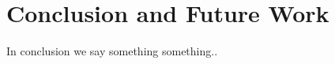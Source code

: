\section{Conclusion and Future Work}
\label{sec:conclusion}

In conclusion we say something something..